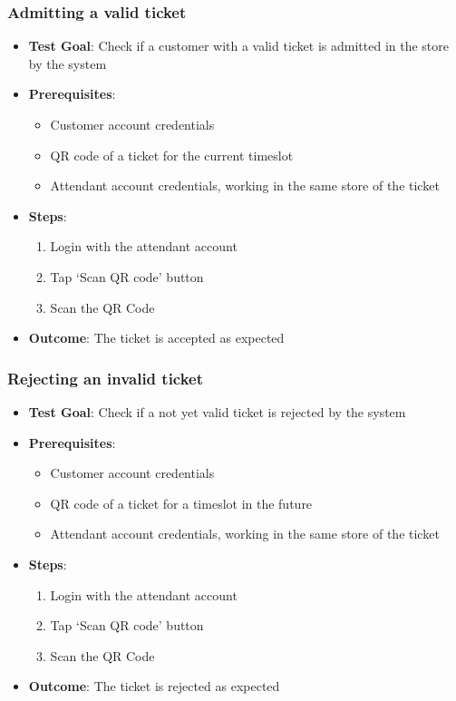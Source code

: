 \subsubsection{Admitting a valid ticket}
\begin{itemize}
    \item \textbf{Test Goal}: Check if a customer with a valid ticket is admitted in the store by the system
    \item \textbf{Prerequisites}:
          \begin{itemize}
              \item Customer account credentials
              \item QR code of a ticket for the current timeslot
              \item Attendant account credentials, working in the same store of the ticket
          \end{itemize}
    \item \textbf{Steps}:
          \begin{enumerate}
              \item Login with the attendant account
              \item Tap `Scan QR code' button
              \item Scan the QR Code
          \end{enumerate}
    \item \textbf{Outcome}: The ticket is accepted as expected
\end{itemize}
\subsubsection{Rejecting an invalid ticket}
\begin{itemize}
    \item \textbf{Test Goal}: Check if a not yet valid ticket is rejected by the system
    \item \textbf{Prerequisites}:
          \begin{itemize}
              \item Customer account credentials
              \item QR code of a ticket for a timeslot in the future
              \item Attendant account credentials, working in the same store of the ticket
          \end{itemize}
    \item \textbf{Steps}:
          \begin{enumerate}
              \item Login with the attendant account
              \item Tap `Scan QR code' button
              \item Scan the QR Code
          \end{enumerate}
    \item \textbf{Outcome}: The ticket is rejected as expected
\end{itemize}

